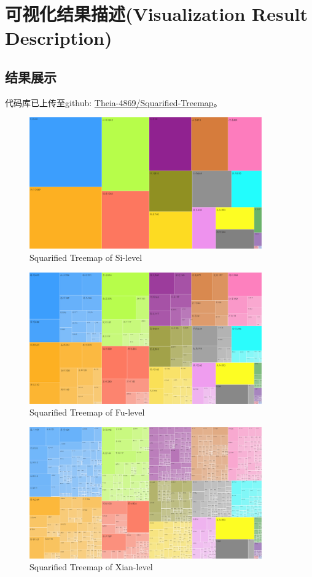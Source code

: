 \documentclass[11pt]{article}
\begin{document}
	\section{可视化结果描述(Visualization Result Description)}
	\subsection{结果展示}
	代码库已上传至github: \href{https://github.com/Theia-4869/Squarified-Treemap}{Theia-4869/Squarified-Treemap}。
	
	\begin{figure}[H]
		\centering
		\includegraphics[width=10cm]{./figures/si_squarified_treemap.png}
		\caption{Squarified Treemap of Si-level}
	\end{figure}
	\begin{figure}[H]
		\centering
		\includegraphics[width=10cm]{./figures/fu_squarified_treemap.png}
		\caption{Squarified Treemap of Fu-level}
	\end{figure}
	\begin{figure}[H]
		\centering
		\includegraphics[width=10cm]{./figures/xian_squarified_treemap.png}
		\caption{Squarified Treemap of Xian-level}
	\end{figure}
\end{document}
